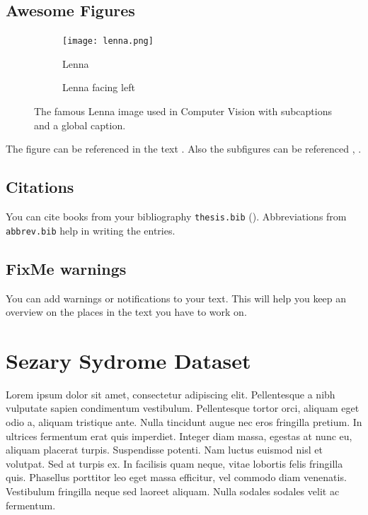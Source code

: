 \subsection[Awesome Figures in the TOC]{Awesome Figures} %
\label{sub:figures}
\begin{figure}[ht]
	\begin{center}
		\begin{subfigure}[b]{0.49\textwidth}
			\texttt{[image: lenna.png]}
			\caption{Lenna}
			\label{fig:lenna}
		\end{subfigure}
		\begin{subfigure}[b]{0.49\textwidth}
			\caption{Lenna facing left}
			\label{fig:lenna_facing_left}
		\end{subfigure}
	\end{center}
	\caption{The famous Lenna image used in Computer Vision with subcaptions and a global caption.}
	\label{fig:lennas}
\end{figure}
The figure can be referenced in the text \eg{}.
Also the subfigures can be referenced \eg{}, .

\subsection{Citations} %
\label{sub:citations}
You can cite books from your bibliography \texttt{thesis.bib} (\eg \cite{cochrane}).
Abbreviations from \texttt{abbrev.bib} help in writing the entries.

\subsection{FixMe warnings}
\label{sub:fixme}
You can add warnings or notifications to your text.
This will help you keep an overview on the places in the text you have to work on.

\section{Sezary Sydrome Dataset}
\label{sec:lorem}
Lorem ipsum dolor sit amet, consectetur adipiscing elit. Pellentesque a nibh vulputate sapien condimentum vestibulum. Pellentesque tortor orci, aliquam eget odio a, aliquam tristique ante. Nulla tincidunt augue nec eros fringilla pretium. In ultrices fermentum erat quis imperdiet. Integer diam massa, egestas at nunc eu, aliquam placerat turpis. Suspendisse potenti. Nam luctus euismod nisl et volutpat. Sed at turpis ex. In facilisis quam neque, vitae lobortis felis fringilla quis. Phasellus porttitor leo eget massa efficitur, vel commodo diam venenatis. Vestibulum fringilla neque sed laoreet aliquam. Nulla sodales sodales velit ac fermentum.

